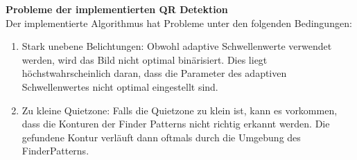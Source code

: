 \textbf{Probleme der implementierten QR Detektion} \\
Der implementierte Algorithmus hat Probleme unter den folgenden Bedingungen:
\begin{enumerate}
\item Stark unebene Belichtungen: Obwohl adaptive Schwellenwerte verwendet werden, wird das Bild nicht optimal binärisiert. Dies liegt höchstwahrscheinlich daran, dass die Parameter des adaptiven Schwellenwertes nicht optimal eingestellt sind. 

\item Zu kleine Quietzone: Falls die Quietzone zu klein ist, kann es vorkommen, dass die Konturen der Finder Patterns nicht richtig erkannt werden. Die gefundene Kontur verläuft dann oftmals durch die Umgebung des FinderPatterns.
\end{enumerate}

